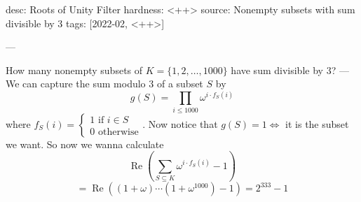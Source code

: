 desc: Roots of Unity Filter
hardness: <++>
source: Nonempty subsets with sum divisible by 3
tags: [2022-02, <++>]

---

How many nonempty subsets of $K = \{1, 2, \dots, 1000\}$ have sum divisible by
$3$?
---
We can capture the sum modulo $3$ of a subset $S$ by 
\[
  g(S) = \prod_{i \leq 1000} \omega^{i \cdot f_S(i)}
\]
where $f_S(i) = \begin{cases}
  1 \text{ if } i \in S \\
  0 \text{ otherwise}
\end{cases}$.
Now notice that $g(S) = 1 \iff$ it is the subset we want. So now we wanna calculate 
\[
  \operatorname{Re} \left( \sum_{S \subseteq K} \omega^{i \cdot f_S(i)} -1  \right)
\]
\[
  = \operatorname{Re} \left((1+\omega)\cdots(1+ \omega^{1000}) - 1 \right)
  = 2^{333} - 1
\]
